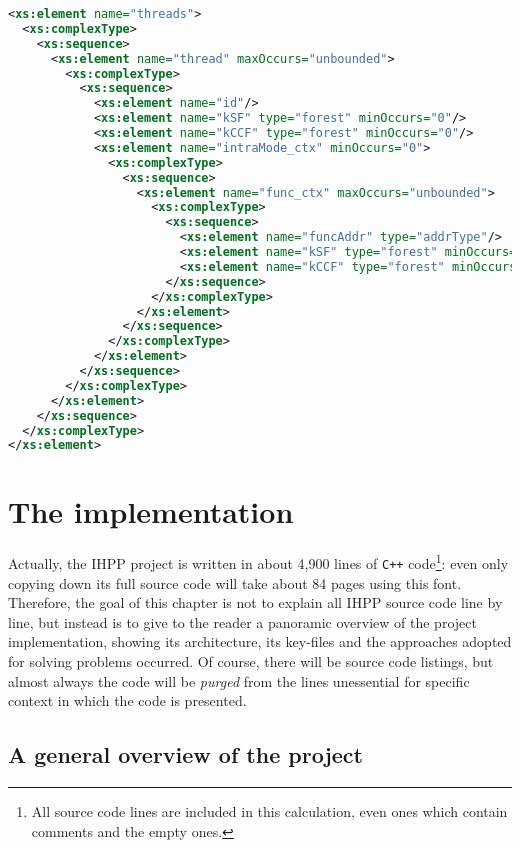 \documentclass[a4paper,10pt]{report}
\begin{document}
\begin{lstlisting}[language=XML, frame=leftline,
caption={an extract from \texttt{outputschema.xsd}}, label={xsd},
morekeywords={encoding, xs:schema,xs:element,
xs:complexType,xs:sequence,xs:attribute}]
<xs:element name="threads">
  <xs:complexType>
    <xs:sequence>
      <xs:element name="thread" maxOccurs="unbounded">
        <xs:complexType>
          <xs:sequence>
            <xs:element name="id"/>
            <xs:element name="kSF" type="forest" minOccurs="0"/>
            <xs:element name="kCCF" type="forest" minOccurs="0"/>
            <xs:element name="intraMode_ctx" minOccurs="0">
              <xs:complexType>
                <xs:sequence>
                  <xs:element name="func_ctx" maxOccurs="unbounded">
                    <xs:complexType>
                      <xs:sequence>
                        <xs:element name="funcAddr" type="addrType"/>
                        <xs:element name="kSF" type="forest" minOccurs="0"/>
                        <xs:element name="kCCF" type="forest" minOccurs="0"/>
                      </xs:sequence>
                    </xs:complexType>
                  </xs:element>
                </xs:sequence>
              </xs:complexType>
            </xs:element>
          </xs:sequence>
        </xs:complexType>
      </xs:element>
    </xs:sequence>
  </xs:complexType>
</xs:element>
\end{lstlisting}


\chapter{The implementation}

Actually, the IHPP project is written in about 4,900 lines of \verb|C++|
code\footnote{All source code lines are included in this calculation, even ones which
contain comments and the empty ones.}:
even only copying down its full source code will take about 84 pages using
this font. Therefore, the goal of this chapter is not to explain
all IHPP source code line by line, but instead is to give to the reader
a panoramic overview of the project implementation, showing its architecture,
its key-files and the approaches adopted for solving problems occurred.
Of course, there will be source code listings, but almost always the code will be
\emph{purged} from the lines unessential for specific context in which the code is presented.

\section{A general overview of the project}
\end{document}
